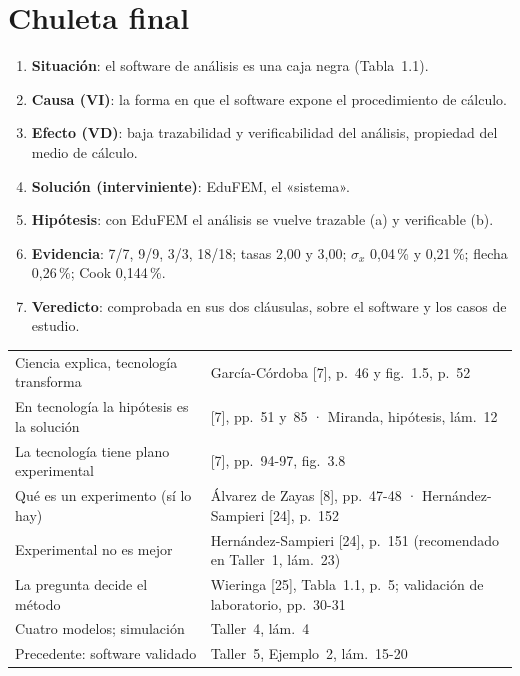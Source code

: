 \documentclass[11pt,a4paper]{article}
\begin{document}
\clearpage
\section{Chuleta final}\label{sec:chuleta}

\begin{memorizar}
\begin{enumerate}[leftmargin=1.5em,itemsep=0pt]
\item \textbf{Situación}: el software de análisis es una caja negra (Tabla~1.1).
\item \textbf{Causa (VI)}: la forma en que el software expone el procedimiento de cálculo.
\item \textbf{Efecto (VD)}: baja trazabilidad y verificabilidad del análisis, propiedad del medio de cálculo.
\item \textbf{Solución (interviniente)}: EduFEM, el «sistema».
\item \textbf{Hipótesis}: con EduFEM el análisis se vuelve trazable (a) y verificable (b).
\item \textbf{Evidencia}: 7/7, 9/9, 3/3, 18/18; tasas 2,00 y 3,00; $\sigma_x$ 0,04\,\% y 0,21\,\%; flecha 0,26\,\%; Cook 0,144\,\%.
\item \textbf{Veredicto}: comprobada en sus dos cláusulas, sobre el software y los casos de estudio.
\end{enumerate}
\end{memorizar}

\begin{decir}
\small
\begin{tabular}{@{}L{6.6cm}L{8.6cm}@{}}
Ciencia explica, tecnología transforma & García-Córdoba [7], p.~46 y fig.~1.5, p.~52\\
En tecnología la hipótesis es la solución & [7], pp.~51 y~85 · Miranda, hipótesis, lám.~12\\
La tecnología tiene plano experimental & [7], pp.~94-97, fig.~3.8\\
Qué es un experimento (sí lo hay) & Álvarez de Zayas [8], pp.~47-48 · Hernández-Sampieri [24], p.~152\\
Experimental no es mejor & Hernández-Sampieri [24], p.~151 (recomendado en Taller~1, lám.~23)\\
La pregunta decide el método & Wieringa [25], Tabla~1.1, p.~5; validación de laboratorio, pp.~30-31\\
Cuatro modelos; simulación & Taller~4, lám.~4\\
Precedente: software validado & Taller~5, Ejemplo~2, lám.~15-20\\
\end{tabular}
\end{decir}
\end{document}
